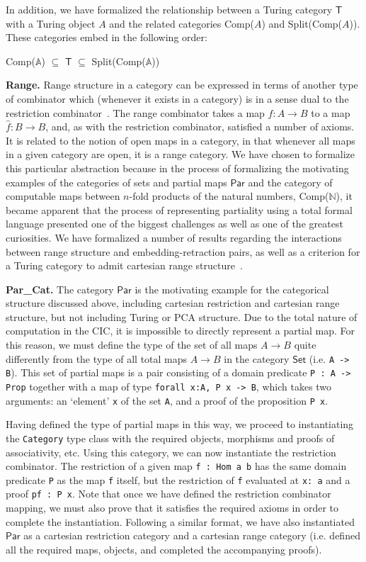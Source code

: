 \documentclass{entcs} \usepackage{entcsmacro}
\begin{document}
In addition, we have formalized the relationship between a Turing category $\mathsf{T}$ with a Turing object $A$ and the related categories Comp($A$) and Split(Comp($A$)). These categories embed in the following order:

\indent Comp($\mathbb{A}$) $\subseteq$ $\mathsf{T}$ $\subseteq$ Split(Comp($\mathbb{A}$))

{\bfseries Range.} Range structure in a category can be expressed in terms of another type of combinator which (whenever it exists in a category) is in a sense dual to the restriction combinator~\cite{RangeI}. The range combinator takes a map $f : A \to B$ to a map $\hat{f} : B \to B$, and, as with the restriction combinator, satisfied a number of axioms. It is related to the notion of open maps in a category, in that whenever all maps in a given category are open, it is a range category. We have chosen to formalize this particular abstraction because in the process of formalizing the motivating examples of the categories of sets and partial maps $\mathsf{Par}$ and the category of computable maps between $n$-fold products of the natural numbers, Comp($\mathbb{N}$), it became apparent that the process of representing partiality using a total formal language presented one of the biggest challenges as well as one of the greatest curiosities. We have formalized a number of results regarding the interactions between range structure and embedding-retraction pairs, as well as a criterion for a Turing category to admit cartesian range structure~\cite{MyThesis}.

{\bfseries Par\_Cat.} The category $\mathsf{Par}$ is the motivating example for the categorical structure discussed above, including cartesian restriction and cartesian range structure, but not including Turing or PCA structure. Due to the total nature of computation in the CIC, it is impossible to directly represent a partial map. For this reason, we must define the type of the set of all maps $A \to B$ quite differently from the type of all total maps $A \to B$ in the category $\mathsf{Set}$ (i.e. {\tt \small A -> B}). This set of partial maps is a pair consisting of a domain predicate {\tt \small P : A -> Prop} together with a map of type {\tt \small forall x:A, P x -> B}, which takes two arguments: an `element' {\tt \small x} of the set {\tt \small A}, and a proof of the proposition {\tt \small P x}. 

Having defined the type of partial maps in this way, we proceed to instantiating the {\tt \small Category} type class with the required objects, morphisms and proofs of associativity, etc. Using this category, we can now instantiate the restriction combinator. The restriction of a given map {\tt \small f : Hom a b} has the same domain predicate {\tt \small P} as the map {\tt \small f} itself, but the restriction of {\tt \small f} evaluated at {\tt \small x: a} and a proof {\tt \small pf : P x}. Note that once we have defined the restriction combinator mapping, we must also prove that it satisfies the required axioms in order to complete the instantiation. Following a similar format, we have also instantiated $\mathsf{Par}$ as a cartesian restriction category and a cartesian range category (i.e. defined all the required maps, objects, and completed the accompanying proofs).
\end{document}
